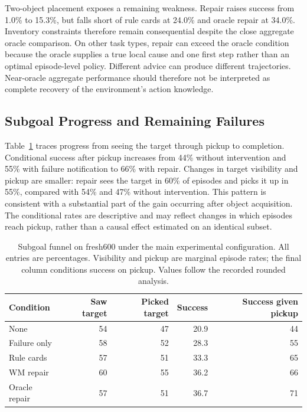 \documentclass[runningheads]{llncs}
\begin{document}
Two-object placement exposes a remaining weakness. Repair raises success from 1.0\% to 15.3\%, but falls short of rule cards at 24.0\% and oracle repair at 34.0\%. Inventory constraints therefore remain consequential despite the close aggregate oracle comparison. On other task types, repair can exceed the oracle condition because the oracle supplies a true local cause and one first step rather than an optimal episode-level policy. Different advice can produce different trajectories. Near-oracle aggregate performance should therefore not be interpreted as complete recovery of the environment's action knowledge.

\subsection{Subgoal Progress and Remaining Failures}
Table~\ref{tab:funnel} traces progress from seeing the target through pickup to completion. Conditional success after pickup increases from 44\% without intervention and 55\% with failure notification to 66\% with repair. Changes in target visibility and pickup are smaller: repair sees the target in 60\% of episodes and picks it up in 55\%, compared with 54\% and 47\% without intervention. This pattern is consistent with a substantial part of the gain occurring after object acquisition. The conditional rates are descriptive and may reflect changes in which episodes reach pickup, rather than a causal effect estimated on an identical subset.

\begin{table}[tbp]
\caption{Subgoal funnel on fresh600 under the main experimental configuration. All entries are percentages. Visibility and pickup are marginal episode rates; the final column conditions success on pickup. Values follow the recorded rounded analysis.}
\label{tab:funnel}\centering
\begin{tabular}{lrrrr}\toprule
Condition & Saw target & Picked target & Success & Success given pickup\\\midrule
None & 54 & 47 & 20.9 & 44\\
Failure only & 58 & 52 & 28.3 & 55\\
Rule cards & 57 & 51 & 33.3 & 65\\
WM repair & 60 & 55 & 36.2 & 66\\
Oracle repair & 57 & 51 & 36.7 & 71\\\bottomrule
\end{tabular}
\end{table}
\end{document}
